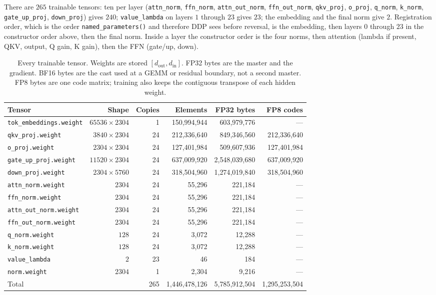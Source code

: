 \documentclass[11pt]{article}
\DeclareRobustCommand{\code}[1]{\texttt{#1}}
\begin{document}
There are \(265\) trainable tensors: ten per layer
(\code{attn\_norm}, \code{ffn\_norm}, \code{attn\_out\_norm},
\code{ffn\_out\_norm}, \code{qkv\_proj}, \code{o\_proj}, \code{q\_norm},
\code{k\_norm}, \code{gate\_up\_proj}, \code{down\_proj}) gives \(240\);
\code{value\_lambda} on layers \(1\) through \(23\) gives \(23\); the
embedding and the final norm give \(2\). Registration order, which is the
order \code{named\_parameters()} and therefore DDP sees before reversal, is
the embedding, then layers \(0\) through \(23\) in the constructor order
above, then the final norm. Inside a layer the constructor order is the four
norms, then attention (lambda if present, QKV, output, Q gain, K gain), then
the FFN (gate/up, down).

\begin{table}[t]
\centering
\caption{Every trainable tensor. Weights are stored \([d_{\mathrm{out}},d_{\mathrm{in}}]\).
FP32 bytes are the master and the gradient. BF16 bytes are the cast used at
a GEMM or residual boundary, not a second master. FP8 bytes are one code
matrix; training also keeps the contiguous transpose of each hidden weight.}
\label{tab:params}
\small
\begin{tabular}{@{}lrrrrr@{}}
\toprule
Tensor & Shape & Copies & Elements & FP32 bytes & FP8 codes \\
\midrule
\code{tok\_embeddings.weight} & \(65536\times 2304\) & 1 & 150{,}994{,}944 & 603{,}979{,}776 & --- \\
\code{qkv\_proj.weight} & \(3840\times 2304\) & 24 & 212{,}336{,}640 & 849{,}346{,}560 & 212{,}336{,}640 \\
\code{o\_proj.weight} & \(2304\times 2304\) & 24 & 127{,}401{,}984 & 509{,}607{,}936 & 127{,}401{,}984 \\
\code{gate\_up\_proj.weight} & \(11520\times 2304\) & 24 & 637{,}009{,}920 & 2{,}548{,}039{,}680 & 637{,}009{,}920 \\
\code{down\_proj.weight} & \(2304\times 5760\) & 24 & 318{,}504{,}960 & 1{,}274{,}019{,}840 & 318{,}504{,}960 \\
\code{attn\_norm.weight} & \(2304\) & 24 & 55{,}296 & 221{,}184 & --- \\
\code{ffn\_norm.weight} & \(2304\) & 24 & 55{,}296 & 221{,}184 & --- \\
\code{attn\_out\_norm.weight} & \(2304\) & 24 & 55{,}296 & 221{,}184 & --- \\
\code{ffn\_out\_norm.weight} & \(2304\) & 24 & 55{,}296 & 221{,}184 & --- \\
\code{q\_norm.weight} & \(128\) & 24 & 3{,}072 & 12{,}288 & --- \\
\code{k\_norm.weight} & \(128\) & 24 & 3{,}072 & 12{,}288 & --- \\
\code{value\_lambda} & \(2\) & 23 & 46 & 184 & --- \\
\code{norm.weight} & \(2304\) & 1 & 2{,}304 & 9{,}216 & --- \\
\midrule
Total & & 265 & 1{,}446{,}478{,}126 & 5{,}785{,}912{,}504 & 1{,}295{,}253{,}504 \\
\bottomrule
\end{tabular}
\end{table}
\end{document}
